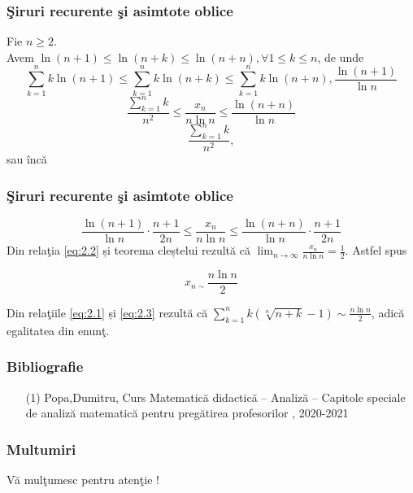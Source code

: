 \documentclass{beamer}
\theoremstyle{plain}
\begin{document}
{
\frametitle{\c Siruri recurente \c si asimtote oblice}
Fie \(n\geq 2\). 
\\ Avem \(\ln \left ( n+1 \right )\leq \ln \left ( n+k \right )\leq \ln \left ( n+n \right ), \forall 1\leq k\leq n\), de unde 
\begin{displaymath}
 \sum_{k=1}^{n} k \ln \left ( n+1 \right )\leq \sum_{k=1}^{n}k \ln \left ( n+k \right )\leq \sum_{k=1}^{n} k \ln \left ( n+n \right ), \frac{\ln \left ( n+1 \right )}{\ln n }
\end{displaymath}
\begin{displaymath}
 \frac{\sum_{k=1}^{n}k}{n^{2}}\leq \frac{x_{n}}{n\ln n}\leq \frac{\ln \left ( n+n \right )}{\ln n }
\end{displaymath}
\begin{displaymath}
 \frac{\sum_{k=1}^{n}k}{n^{2}},
\end{displaymath}
 sau \^ inc\u a
}
\frame
{
\frametitle{\c Siruri recurente \c si asimtote oblice}
\begin{displaymath}
 \frac{\ln \left ( n+1 \right )}{\ln n} \cdot \frac{n+1}{2n}\leq \frac{x_{n}}{n\ln n }\leq \frac{\ln \left ( n+n \right )}{\ln n }\cdot \frac{n+1}{2n} \label{eq:2.2} \tag{2.2}
\end{displaymath}
Din rela\c tia \ref{eq:2.2} și teorema cleștelui rezult\u a c\u a \(\lim_{n \to \infty }\frac{x_{n}}{n\ln n } = \frac{1}{2}\). Astfel spus 

\begin{displaymath}
x_{n\sim }\frac{n\ln n }{2} \label{eq:2.3} \tag{2.3}
\end{displaymath}

Din rela\c tiile \ref{eq:2.1} și \ref{eq:2.3} rezult\u a c\u a \(\sum_{k=1}^{n}k\left ( \sqrt[n]{n+k}-1 \right )\sim \frac{n\ln n }{2}\), adic\u a egalitatea din enun\c t. 

}
\frame
{
\frametitle{Bibliografie}
\begin{itemize}
\item[(1)] Popa,Dumitru, Curs Matematic\u a didactic\u a – Analiz\u a – Capitole speciale de analiz\u a matematic\u a pentru preg\u atirea profesorilor , 2020-2021
\end{itemize}
}
\frame
{\frametitle{Multumiri}
\begin{center}
{\Large V\u a mul\c tumesc pentru aten\c tie !}	
\end{center}
}
\end{document}
